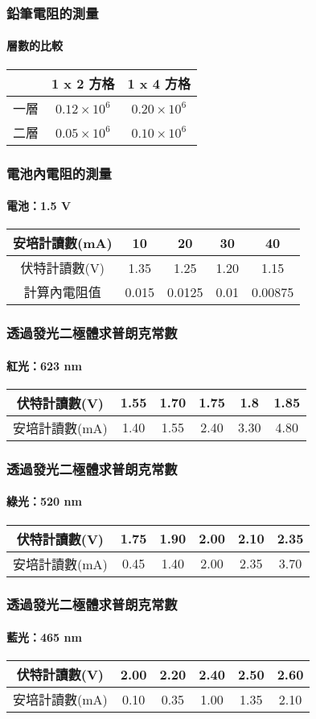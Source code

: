 \documentclass{beamer}
\begin{document}
\begin{frame}
	\frametitle{鉛筆電阻的測量}
	\framesubtitle{層數的比較}
	\begin{tabular}{|c|c|c|}
		\hline
		& 1 x 2 方格 & 1 x 4 方格  \\
		\hline
		一層 & $0.12 \times 10^6$ & $0.20 \times 10^6$  \\
		\hline
		二層 & $0.05 \times 10^6$ & $0.10 \times 10^6$  \\
		\hline
	\end{tabular}
\end{frame}

\begin{frame}
	\frametitle{電池內電阻的測量}
	\framesubtitle{電池：1.5 V}
	\begin{tabular}{|c|c|c|c|c|}
		\hline
		安培計讀數(mA) & 10 & 20 & 30 & 40  \\
		\hline
		伏特計讀數(V) & 1.35 & 1.25 & 1.20 & 1.15  \\
		\hline
		計算內電阻值 & 0.015 & 0.0125 & 0.01 & 0.00875 \\
		\hline
	\end{tabular}
\end{frame}

\begin{frame}
	\frametitle{透過發光二極體求普朗克常數}
	\framesubtitle{紅光：623 nm}
	\begin{tabular}{|c|c|c|c|c|c|}
		\hline
		伏特計讀數(V) & 1.55 & 1.70 & 1.75 & 1.8 & 1.85  \\
		\hline
		安培計讀數(mA) & 1.40 & 1.55 & 2.40 & 3.30 & 4.80  \\
		\hline
	\end{tabular}
\end{frame}

\begin{frame}
	\frametitle{透過發光二極體求普朗克常數}
	\framesubtitle{綠光：520 nm}
	\begin{tabular}{|c|c|c|c|c|c|}
		\hline
		伏特計讀數(V) & 1.75 & 1.90 & 2.00 & 2.10 & 2.35  \\
		\hline
		安培計讀數(mA) & 0.45 & 1.40 & 2.00 & 2.35 & 3.70  \\
		\hline
	\end{tabular}
\end{frame}

\begin{frame}
	\frametitle{透過發光二極體求普朗克常數}
	\framesubtitle{藍光：465 nm}
	\begin{tabular}{|c|c|c|c|c|c|}
		\hline
		伏特計讀數(V) & 2.00 & 2.20 & 2.40 & 2.50 & 2.60  \\
		\hline
		安培計讀數(mA) & 0.10 & 0.35 & 1.00 & 1.35 & 2.10  \\
		\hline
	\end{tabular}
\end{frame}
\end{document}
